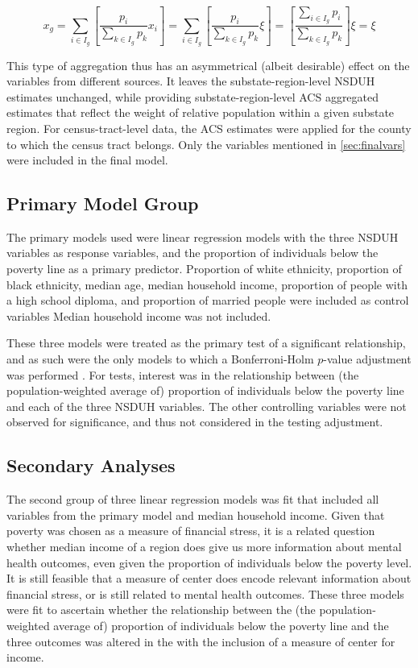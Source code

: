 \documentclass{article}
\begin{document}
\begin{equation*}
    x_g =
    \sum_{i \in I_g}
    \left[ \frac{p_{i}}{\sum_{k \in I_g} p_{k}} x_i \right] =
    \sum_{i \in I_g}
    \left[ \frac{p_{i}}{\sum_{k \in I_g} p_{k}} \xi \right] =
    \left[ \frac{\sum_{i \in I_g}p_{i}}{\sum_{k \in I_g} p_{k}} \right] \xi =
    \xi
\end{equation*}

This type of aggregation thus has an asymmetrical (albeit desirable)
effect on the variables from different sources.
It leaves the substate-region-level NSDUH estimates unchanged,
while providing substate-region-level ACS aggregated estimates
that reflect the weight of relative population within a given substate region.
For census-tract-level data, the ACS estimates
were applied for the county to which the census tract belongs.
Only the variables mentioned in \ref{sec:finalvars}
were included in the final model.

\subsection{Primary Model Group}

The primary models used were linear regression models with the three NSDUH
variables as response variables, and
the proportion of individuals below the poverty line as a primary predictor.
Proportion of white ethnicity,
proportion of black ethnicity,
median age,
median household income,
proportion of people with a high school diploma,
and
proportion of married people
were included as control variables
Median household income was not included.

These three models were treated as the primary test
of a significant relationship,
and as such were the only models to which a Bonferroni-Holm
$p$-value adjustment was performed \cite{holm}.
For tests, interest was in the relationship between
(the population-weighted average of)
proportion of individuals below the poverty line
and each of the three NSDUH variables.
The other controlling variables were not
observed for significance,
and thus not considered in the testing adjustment.


\subsection{Secondary Analyses}

The second group of three linear regression models
was fit that included all variables
from the primary model
and
median household income.
Given that poverty was chosen as a measure of financial stress,
it is a related question whether
median income of a region does give us more information about mental
health outcomes, even given the proportion of individuals below the
poverty level. It is still feasible that a measure of center does encode
relevant information about financial stress, or is still related to
mental health outcomes.
These three models were fit to ascertain whether
the relationship between the
(the population-weighted average of)
proportion of individuals below the poverty line
and the three outcomes was altered in the
with the inclusion of a measure of center for income.
\end{document}

